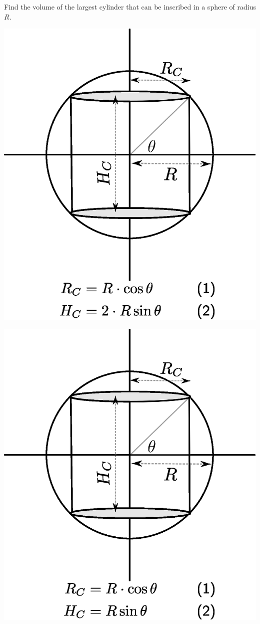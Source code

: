 \documentclass[14pt,fleqn]{extarticle}
\begin{document}
Find the volume of the largest cylinder that
can be inscribed in a sphere of radius $R$. 
%

\newcard

\includegraphics[scale=0.5]{right.eps}

\newcard 

\includegraphics[scale=0.5]{wrong.eps}
\end{document}
